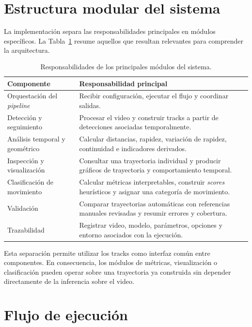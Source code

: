 \section{Estructura modular del sistema}

La implementación separa las responsabilidades principales en módulos específicos. La Tabla~\ref{tab:modulos-sistema} resume aquellos que resultan relevantes para comprender la arquitectura.

\begin{table}[H]
  \centering
  \footnotesize
  \setlength{\tabcolsep}{5pt}
  \renewcommand{\arraystretch}{1.12}
  \caption{Responsabilidades de los principales módulos del sistema.}
  \label{tab:modulos-sistema}
  \begin{tabularx}{0.94\textwidth}{@{}p{}X@{}}
    \toprule
    \textbf{Componente} & \textbf{Responsabilidad principal} \\
    \midrule
    Orquestación del \textit{pipeline} & Recibir configuración, ejecutar el flujo y coordinar salidas. \\
    Detección y seguimiento & Procesar el video y construir tracks a partir de detecciones asociadas temporalmente. \\
    Análisis temporal y geométrico & Calcular distancias, rapidez, variación de rapidez, continuidad e indicadores derivados. \\
    Inspección y visualización & Consultar una trayectoria individual y producir gráficos de trayectoria y comportamiento temporal. \\
    Clasificación de movimiento & Calcular métricas interpretables, construir \textit{scores} heurísticos y asignar una categoría de movimiento. \\
    Validación & Comparar trayectorias automáticas con referencias manuales revisadas y resumir errores y cobertura. \\
    Trazabilidad & Registrar video, modelo, parámetros, opciones y entorno asociados con la ejecución. \\
    \bottomrule
  \end{tabularx}
\end{table}

Esta separación permite utilizar los tracks como interfaz común entre componentes. En consecuencia, los módulos de métricas, visualización o clasificación pueden operar sobre una trayectoria ya construida sin depender directamente de la inferencia sobre el video.

\section{Flujo de ejecución}

